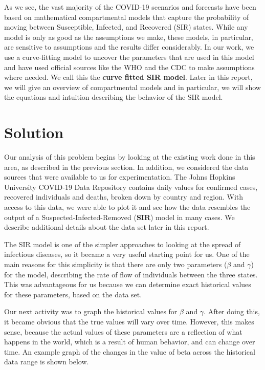 \documentclass[11pt]{article}
\begin{document}
As we see, the vast majority of the COVID-19 scenarios and forecasts have been based on mathematical compartmental models that capture the probability of moving between Susceptible, Infected, and Recovered (SIR) states. While any model is only as good as the assumptions we make, these models, in particular, are sensitive to assumptions and the results differ considerably. In our work, we use a curve-fitting model to uncover the parameters that are used in this model and have used official sources like the WHO and the CDC to make assumptions where needed. We call this the \textbf{curve fitted SIR model}. Later in this report, we will give an overview of compartmental models and in particular, we will show the equations and intuition describing the behavior of the SIR model.

\section{Solution}

Our analysis of this problem begins by looking at the existing work done in this area, as described in the previous section. In addition, we considered the data sources that were available to us for experimentation. The Johns Hopkins University COVID-19 Data Repository contains daily values for confirmed cases, recovered individuals and deaths, broken down by country and region. With access to this data, we were able to plot it and see how the data resembles the output of a Suspected-Infected-Removed (\textbf{SIR}) model in many cases. We describe additional details about the data set later in this report.

The SIR model is one of the simpler approaches to looking at the spread of infectious diseases, so it became a very useful starting point for us. One of the main reasons for this simplicity is that there are only two parameters ($\beta$ and $\gamma$) for the model, describing the rate of flow of individuals between the three states. This was advantageous for us because we can determine exact historical values for these parameters, based on the data set.

Our next activity was to graph the historical values for $\beta$ and $\gamma$. After doing this, it became obvious that the true values will vary over time. However, this makes sense, because the actual values of these parameters are a reflection of what happens in the world, which is a result of human behavior, and can change over time. An example graph of the changes in the value of beta across the historical data range is shown below.
\end{document}
